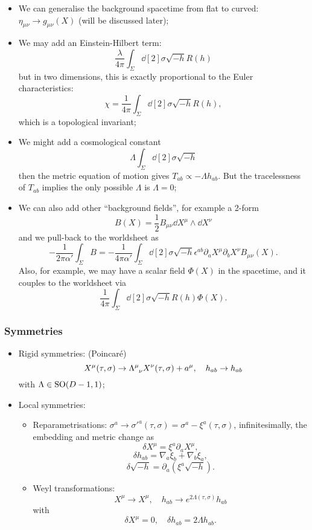 \documentclass[a4paper,11pt]{article}
\begin{document}
	\begin{itemize}
		\item We can generalise the background spacetime from flat to curved: $\eta _{\mu \nu} \to g _{\mu \nu}(X)$ (will be discussed later);
		\item We may add an Einstein-Hilbert term: \[
			\frac{\lambda}{4 \pi} \int_\Sigma \dd[2]{\sigma} \sqrt{-h} R(h)
		\]
		but in two dimensions, this is exactly proportional to the Euler characteristics:
		\[
			\chi = \frac{1}{4 \pi} \int_\Sigma \dd[2]{\sigma} \sqrt{-h}R(h),
		\]
		which is a topological invariant;
		\item We might add a cosmological constant \[
			\Lambda \int_\Sigma \dd[2]{\sigma}\sqrt{-h}
		\]
		then the metric equation of motion gives $T _{a b} \propto -\Lambda h _{a b}$. But the tracelessness of $T _{a b}$ implies the only possible $\Lambda$ is $\Lambda = 0$;
		\item We can also add other ``background fields'', for example a 2-form \[
			B(X) = \frac{1}{2} B _{\mu \nu} \dd{X^\mu} \wedge \dd{X^\nu}
		\]
		and we pull-back to the worldsheet as 
		\[
			- \frac{1}{2 \pi \alpha'} \int_\Sigma B = - \frac{1}{4 \pi \alpha'} \int_\Sigma \dd[2]{\sigma} \sqrt{-h} \epsilon ^{a b} \partial_a X^\mu \partial_b X^\nu B _{\mu \nu}(X).
		\]
		Also, for example, we may have a scalar field $\Phi(X)$ in the spacetime, and it couples to the worldsheet via 
		\[
			\frac{1}{4 \pi} \int_\Sigma \dd[2]{\sigma} \sqrt{-h} R(h) \Phi(X).
		\]
	\end{itemize}

	\subsubsection{Symmetries}

	\begin{itemize}
		\item Rigid symmetries: (Poincar\'e) \[
			X^\mu(\tau,\sigma) \to \LT{\mu}{\nu} X^\nu (\tau,\sigma) + a^\mu, \quad h _{a b} \to h _{a b}
		\]
		with $\Lambda \in \operatorname{SO}(D-1,1)$;
		\item Local symmetries: \begin{itemize}
			\item Reparametrisations: $\sigma^a \to \sigma'^a (\tau,\sigma) = \sigma^a - \xi^a (\tau,\sigma)$, infinitesimally, the embedding and metric change as \[
				\delta X^\mu = \xi^a \partial_a X^\mu,
			\]
			\[
				\delta h _{a b} = \nabla_a \xi_b + \nabla_b \xi_a,
			\]
			\[
				\delta \sqrt{- h } = \partial_a \left( \xi^a \sqrt{-h} \right).
			\]
			\item Weyl transformations: \[
				X^\mu \to X^\mu,\quad h _{a b}\to e ^{2 \Lambda(\tau,\sigma)} h _{a b}
			\]
			with 
			\[
				\delta X^\mu = 0, \quad \delta h _{a b} = 2\Lambda h _{a b}.
			\]
		\end{itemize}
	\end{itemize}
	
\end{document}
